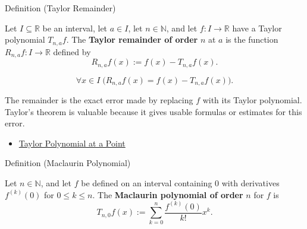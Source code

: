 
\begin{definitionbox}{Definition (Taylor Remainder)}
\begin{definition}
\label{def:taylor-remainder}
Let $I\subseteq\mathbb{R}$ be an interval, let $a\in I$, let
$n\in\mathbb{N}$, and let $f:I\to\mathbb{R}$ have a Taylor polynomial
$T_{n,a}f$. The \textbf{Taylor remainder of order} $n$ at $a$ is the
function $R_{n,a}f:I\to\mathbb{R}$ defined by
\[
  R_{n,a}f(x):=f(x)-T_{n,a}f(x).
\]
\end{definition}
\end{definitionbox}

\begin{remark*}
\[
\forall x\in I\;\bigl(R_{n,a}f(x)=f(x)-T_{n,a}f(x)\bigr).
\]
\end{remark*}

\begin{remark*}[Interpretation]
The remainder is the exact error made by replacing $f$ with its Taylor
polynomial. Taylor's theorem is valuable because it gives usable formulas
or estimates for this error.
\end{remark*}

\begin{remark*}[Dependencies]\hfill
\begin{itemize}
  \item \hyperref[def:taylor-polynomial-at-a-point]{Taylor Polynomial at a Point}
\end{itemize}
\end{remark*}


\begin{definitionbox}{Definition (Maclaurin Polynomial)}
\begin{definition}
\label{def:maclaurin-polynomial}
Let $n\in\mathbb{N}$, and let $f$ be defined on an interval containing
$0$ with derivatives $f^{(k)}(0)$ for $0\le k\le n$. The
\textbf{Maclaurin polynomial of order} $n$ for $f$ is
\[
  T_{n,0}f(x)
  :=
  \sum_{k=0}^{n}\frac{f^{(k)}(0)}{k!}x^k.
\]
\end{definition}
\end{definitionbox}

